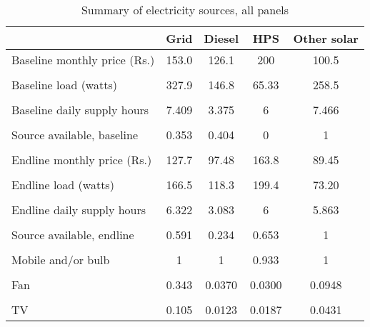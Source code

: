 \begin{table}[htbp]\centering
\caption{Summary of electricity sources, all panels\label{sourcestats}}
\begin{tabular}{l*{4}{c}}
\toprule
                &     Grid&   Diesel&      HPS&Other solar\\
\midrule
Baseline monthly price (Rs.)&    153.0&    126.1&      200&    100.5\\
                &         &         &         &         \\
\addlinespace
Baseline load (watts)&    327.9&    146.8&    65.33&    258.5\\
                &         &         &         &         \\
\addlinespace
Baseline daily supply hours&    7.409&    3.375&        6&    7.466\\
                &         &         &         &         \\
\addlinespace
Source available, baseline&    0.353&    0.404&        0&        1\\
                &         &         &         &         \\
\addlinespace
Endline monthly price (Rs.)&    127.7&    97.48&    163.8&    89.45\\
                &         &         &         &         \\
\addlinespace
Endline load (watts)&    166.5&    118.3&    199.4&    73.20\\
                &         &         &         &         \\
\addlinespace
Endline daily supply hours&    6.322&    3.083&        6&    5.863\\
                &         &         &         &         \\
\addlinespace
Source available, endline&    0.591&    0.234&    0.653&        1\\
                &         &         &         &         \\
\addlinespace
Mobile and/or bulb&        1&        1&    0.933&        1\\
                &         &         &         &         \\
\addlinespace
Fan             &    0.343&   0.0370&   0.0300&   0.0948\\
                &         &         &         &         \\
\addlinespace
TV              &    0.105&   0.0123&   0.0187&   0.0431\\

\end{tabular}
\end{table}
